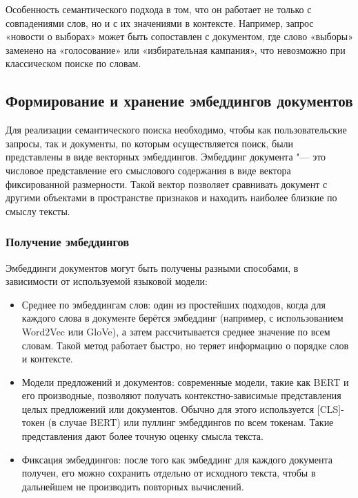 \documentclass[coursework]{SCWorks}
\begin{document}
Особенность семантического подхода в том, что он работает не только с совпадениями слов, но и с их значениями в контексте. Например, запрос «новости о выборах» может быть сопоставлен с документом, где слово «выборы» заменено на «голосование» или «избирательная кампания», что невозможно при классическом поиске по словам.

\subsection{Формирование и хранение эмбеддингов документов}

Для реализации семантического поиска необходимо, чтобы как пользовательские запросы, так и документы, по которым осуществляется поиск, были представлены в виде векторных эмбеддингов. Эмбеддинг документа "--- это числовое представление его смыслового содержания в виде вектора фиксированной размерности. Такой вектор позволяет сравнивать документ с другими объектами в пространстве признаков и находить наиболее близкие по смыслу тексты.

\subsubsection{Получение эмбеддингов}
Эмбеддинги документов могут быть получены разными способами, в зависимости от используемой языковой модели:
\begin{itemize}
    \item 
    Среднее по эмбеддингам слов: один из простейших подходов, когда для каждого слова в документе берётся эмбеддинг (например, с использованием Word2Vec или GloVe), а затем рассчитывается среднее значение по всем словам. Такой метод работает быстро, но теряет информацию о порядке слов и контексте.
    
    \item Модели предложений и документов: современные модели, такие как BERT и его производные, позволяют получать контекстно-зависимые представления целых предложений или документов. Обычно для этого используется [CLS]-токен (в случае BERT) или пуллинг эмбеддингов по всем токенам. Такие представления дают более точную оценку смысла текста.
    
    \item Фиксация эмбеддингов: после того как эмбеддинг для каждого документа получен, его можно сохранить отдельно от исходного текста, чтобы в дальнейшем не производить повторных вычислений.
\end{itemize}
\end{document}
